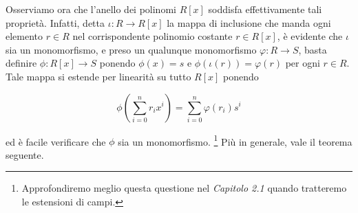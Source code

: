 \noindent Osserviamo ora che l'anello dei polinomi $R[x]$ soddisfa effettivamente tali proprietà. 
Infatti, detta $\iota\colon R\to R[x]$ la mappa di inclusione che manda ogni elemento $r\in R$ 
nel corrispondente polinomio costante $r\in R[x]$, è evidente che $\iota$ sia un monomorfismo, 
e preso un qualunque monomorfismo $\varphi\colon R\to S$, basta definire $\phi\colon R[x]\to S$ 
ponendo $\phi(x)=s$ e $\phi(\iota(r))=\varphi(r)$ per ogni $r\in R$. 
Tale mappa si estende per linearità su tutto $R[x]$ ponendo 

$$\phi\left( \sum\limits_{i=0}^n r_ix^i \right)=\sum\limits_{i=0}^n \varphi(r_i)s^i$$ 

\noindent ed è facile verificare che $\phi$ sia un monomorfismo.
\footnote{Approfondiremo meglio questa questione nel \emph{Capitolo 2.1} quando tratteremo le estensioni di campi.} 
Più in generale, vale il teorema seguente.

